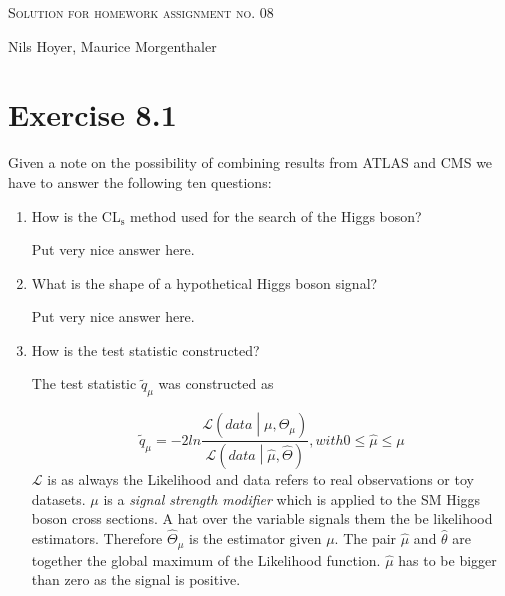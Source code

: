 \documentclass[10pt]{article}
\newenvironment{myfont}{\fontfamily{put}\selectfont}{\par}
\newcommand{\testStat}{\tilde{q}_{\mu}}
\newcommand{\lL}[2]{\mathcal{L}\left(#1 \middle|#2 \right)}
\begin{document}
\begin{myfont}

\begin{center}
  \begin{Large}
    \textsc{Solution for homework assignment no. 08} \\
  \end{Large}
	\vspace*{0.4cm}
    Nils Hoyer, Maurice Morgenthaler
  \vspace*{1cm}
\end{center}

\section*{Exercise 8.1}

Given a note on the possibility of combining results from ATLAS and CMS we have to answer the following ten questions:

\begin{enumerate}
  \item How is the CL$_{\textrm{s}}$ method used for the search of the Higgs boson?

  \noindent Put very nice answer here.

  \item What is the shape of a hypothetical Higgs boson signal?

  \noindent Put very nice answer here.

  \item How is the test statistic constructed?

  \noindent 
  The test statistic $\testStat$ was constructed as 
  
  \begin{equation}
      \testStat = -2 ln \frac{\lL{data}{\mu,\hat{\Theta}_\mu}}{\lL{data}{\hat{\mu},\hat{\Theta}}}, with 0 \leq \hat{\mu} \leq \mu
  \end{equation}
  $\mathcal{L}$ is as always the Likelihood and data refers to real observations or toy datasets. $\mu$ is a \textit{signal strength modifier} which is applied to the SM Higgs boson cross sections. A hat over the variable signals them the be likelihood estimators. Therefore $\hat{\Theta}_{\mu}$ is the estimator given $\mu$. The pair $\hat{\mu}$ and $\hat{\theta}$ are together the global maximum of the Likelihood function. $\hat{\mu}$ has to be bigger than zero as the signal is positive. 


\end{enumerate}
\end{myfont}
\end{document}

